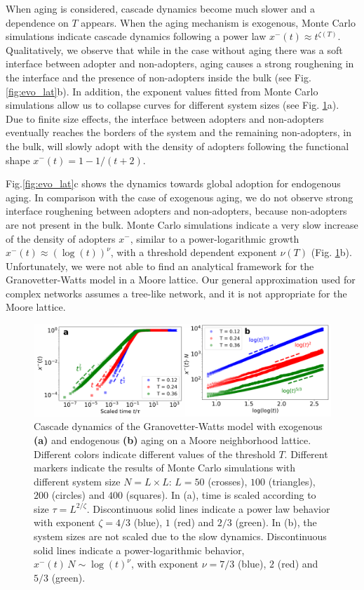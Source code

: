 When aging is considered, cascade dynamics become much slower and a dependence on $T$ appears. When the aging mechanism is exogenous, Monte Carlo simulations indicate cascade dynamics following a power law $x^{-}(t) \approx t^{\zeta(T)}$. Qualitatively, we observe that while in the case without aging there was a soft interface between adopter and non-adopters, aging causes a strong roughening in the interface and the presence of non-adopters inside the bulk (see Fig. \ref{fig:evo_lat}b). In addition, the exponent values fitted from Monte Carlo simulations allow us to collapse curves for different system sizes (see Fig. \ref{fig:lattice}a). Due to finite size effects, the interface between adopters and non-adopters eventually reaches the borders of the system and the remaining non-adopters, in the bulk, will slowly adopt with the density of adopters following the functional shape $x^{-}(t) = 1- 1/(t+2)$.

Fig.\ref{fig:evo_lat}c shows the dynamics towards global adoption for endogenous aging. In comparison with the case of exogenous aging, we do not observe strong interface roughening between adopters and non-adopters, because non-adopters are not present in the bulk. Monte Carlo simulations indicate a very slow increase of the density of adopters $x^{-}$, similar to a power-logarithmic growth  $x^{-}(t) \approx (\log(t))^{\nu}$, with a threshold dependent exponent $\nu(T)$  (Fig. \ref{fig:lattice}b). Unfortunately, we were not able to find an analytical framework for the Granovetter-Watts model in a Moore lattice. Our general approximation used for complex networks assumes a tree-like network, and it is not appropriate for the Moore lattice. 

\begin{figure}
    \centering \captionsetup{font=sf}
    \includegraphics[width=\columnwidth]{Figs/Aging_Threshold/FIGA.pdf}
    \caption[Cascade dynamics snapshots in a lattice]{\label{fig:lattice} Cascade dynamics of the Granovetter-Watts model with exogenous \textbf{(a)} and endogenous \textbf{(b)} aging on a Moore neighborhood lattice. Different colors indicate different values of the threshold $T$. Different markers indicate the results of Monte Carlo simulations with different system size $N = L \times L$:  $L = 50$ (crosses), $100$ (triangles), $200$ (circles) and $400$ (squares). In (a), time is scaled according to size $\tau = L^{2 / \zeta}$. Discontinuous solid lines indicate a power law behavior with exponent $ \zeta = 4/3$ (blue), $1$ (red) and $2/3$ (green). In (b), the system sizes are not scaled due to the slow dynamics. Discontinuous solid lines indicate a power-logarithmic behavior, $x^{-}(t) \, N \sim \log(t)^{\nu} $, with exponent $ \nu = 7/3$ (blue), $2$ (red) and $5/3$ (green).}
\end{figure}
    

